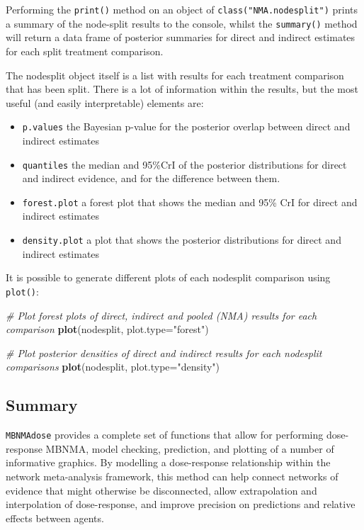 \documentclass[]{article}
\newenvironment{Shaded}{\begin{snugshade}}{\end{snugshade}}
\newcommand{\CommentTok}[1]{\textcolor[rgb]{0.56,0.35,0.01}{\textit{#1}}}
\newcommand{\DataTypeTok}[1]{\textcolor[rgb]{0.13,0.29,0.53}{#1}}
\newcommand{\KeywordTok}[1]{\textcolor[rgb]{0.13,0.29,0.53}{\textbf{#1}}}
\newcommand{\NormalTok}[1]{#1}
\newcommand{\StringTok}[1]{\textcolor[rgb]{0.31,0.60,0.02}{#1}}
\providecommand{\tightlist}{%
  \setlength{\itemsep}{0pt}\setlength{\parskip}{0pt}}
\begin{document}
Performing the \texttt{print()} method on an object of
\texttt{class("NMA.nodesplit")} prints a summary of the node-split
results to the console, whilst the \texttt{summary()} method will return
a data frame of posterior summaries for direct and indirect estimates
for each split treatment comparison.

The nodesplit object itself is a list with results for each treatment
comparison that has been split. There is a lot of information within the
results, but the most useful (and easily interpretable) elements are:

\begin{itemize}
\tightlist
\item
  \texttt{p.values} the Bayesian p-value for the posterior overlap
  between direct and indirect estimates
\item
  \texttt{quantiles} the median and 95\%CrI of the posterior
  distributions for direct and indirect evidence, and for the difference
  between them.
\item
  \texttt{forest.plot} a forest plot that shows the median and 95\% CrI
  for direct and indirect estimates
\item
  \texttt{density.plot} a plot that shows the posterior distributions
  for direct and indirect estimates
\end{itemize}

It is possible to generate different plots of each nodesplit comparison
using \texttt{plot()}:

\begin{Shaded}
\begin{Highlighting}[]
\CommentTok{# Plot forest plots of direct, indirect and pooled (NMA) results for each comparison}
\KeywordTok{plot}\NormalTok{(nodesplit, }\DataTypeTok{plot.type=}\StringTok{"forest"}\NormalTok{)}

\CommentTok{# Plot posterior densities of direct and indirect results for each nodesplit comparisons}
\KeywordTok{plot}\NormalTok{(nodesplit, }\DataTypeTok{plot.type=}\StringTok{"density"}\NormalTok{)}
\end{Highlighting}
\end{Shaded}

\hypertarget{summary}{%
\subsection{Summary}\label{summary}}

\texttt{MBNMAdose} provides a complete set of functions that allow for
performing dose-response MBNMA, model checking, prediction, and plotting
of a number of informative graphics. By modelling a dose-response
relationship within the network meta-analysis framework, this method can
help connect networks of evidence that might otherwise be disconnected,
allow extrapolation and interpolation of dose-response, and improve
precision on predictions and relative effects between agents.
\end{document}
